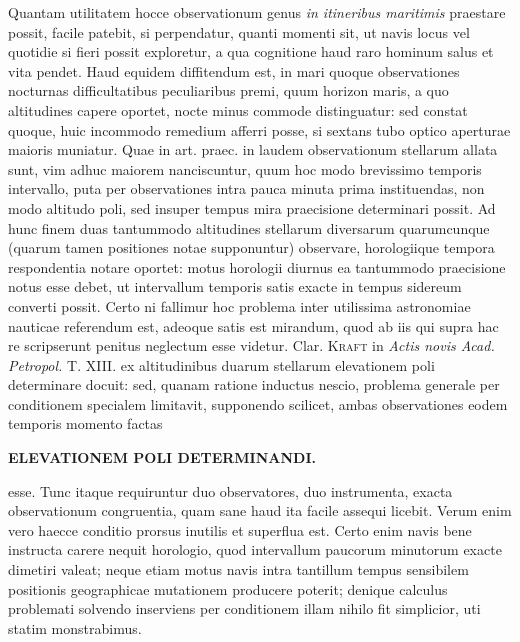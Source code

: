 Quantam utilitatem hocce observationum genus \textit{in itineribus maritimis} praestare possit, facile patebit, si perpendatur, quanti momenti sit, ut navis locus vel quotidie si fieri possit exploretur, a qua cognitione haud raro hominum salus et vita pendet. Haud equidem diffitendum est, in mari quoque observationes nocturnas difficultatibus peculiaribus premi, quum horizon maris, a quo altitudines capere oportet, nocte minus commode distinguatur: sed constat quoque, huic incommodo remedium afferri posse, si sextans tubo optico aperturae maioris muniatur.
Quae in art. praec. in laudem observationum stellarum allata sunt, vim adhuc maiorem nanciscuntur, quum hoc modo brevissimo temporis intervallo, puta per observationes intra pauca minuta prima instituendas, non modo altitudo poli, sed insuper tempus mira praecisione determinari possit. Ad hunc finem duas tantummodo altitudines stellarum diversarum quarumcunque (quarum tamen positiones notae supponuntur) observare, horologiique tempora respondentia notare oportet: motus horologii diurnus ea tantummodo praecisione notus esse debet, ut intervallum temporis satis exacte in tempus sidereum converti possit. Certo ni fallimur hoc problema inter utilissima astronomiae nauticae referendum est, adeoque satis est mirandum, quod ab iis qui supra hac re scripserunt penitus neglectum esse videtur. Clar. \textsc{Kraft} in \textit{Actis novis Acad. Petropol.} T. XIII. ex altitudinibus duarum stellarum elevationem poli determinare docuit: sed, quanam ratione inductus nescio, problema generale per conditionem specialem limitavit, supponendo scilicet, ambas observationes eodem temporis momento factas
\par\clearpage
\noindent{}%
\makebox[12mm][l]{}%
\parbox[t]{\dimexpr\linewidth-24mm\relax}{\centering\fontsize{7.4}{9.2}\selectfont\bfseries ELEVATIONEM POLI DETERMINANDI.\par}%
\par\nobreak\smallskip
\noindent esse. Tunc itaque requiruntur duo observatores, duo instrumenta, exacta observationum congruentia, quam sane haud ita facile assequi licebit. Verum enim vero haecce conditio prorsus inutilis et superflua est. Certo enim navis bene instructa carere nequit horologio, quod intervallum paucorum minutorum exacte dimetiri valeat; neque etiam motus navis intra tantillum tempus sensibilem positionis geographicae mutationem producere poterit; denique calculus problemati solvendo inserviens per conditionem illam nihilo fit simplicior, uti statim monstrabimus.
